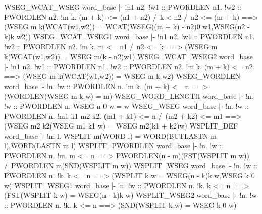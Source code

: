 \ENDTHEOREM
\THEOREM WSEG\_WCAT\_WSEG word\_base
|- !n1 n2.
    !w1 :: PWORDLEN n1.
     !w2 :: PWORDLEN n2.
      !m k.
       (m + k) <= (n1 + n2) /\ k < n2 /\ n2 <= (m + k) ==>
       (WSEG m k(WCAT(w1,w2)) =
        WCAT(WSEG((m + k) - n2)0 w1,WSEG(n2 - k)k w2))
\ENDTHEOREM
\THEOREM WSEG\_WCAT\_WSEG1 word\_base
|- !n1 n2.
    !w1 :: PWORDLEN n1.
     !w2 :: PWORDLEN n2.
      !m k.
       m <= n1 /\ n2 <= k ==> (WSEG m k(WCAT(w1,w2)) = WSEG m(k - n2)w1)
\ENDTHEOREM
\THEOREM WSEG\_WCAT\_WSEG2 word\_base
|- !n1 n2.
    !w1 :: PWORDLEN n1.
     !w2 :: PWORDLEN n2.
      !m k. (m + k) <= n2 ==> (WSEG m k(WCAT(w1,w2)) = WSEG m k w2)
\ENDTHEOREM
\THEOREM WSEG\_WORDLEN word\_base
|- !n.
    !w :: PWORDLEN n. !m k. (m + k) <= n ==> (WORDLEN(WSEG m k w) = m)
\ENDTHEOREM
\THEOREM WSEG\_WORD\_LENGTH word\_base
|- !n. !w :: PWORDLEN n. WSEG n 0 w = w
\ENDTHEOREM
\THEOREM WSEG\_WSEG word\_base
|- !n.
    !w :: PWORDLEN n.
     !m1 k1 m2 k2.
      (m1 + k1) <= n /\ (m2 + k2) <= m1 ==>
      (WSEG m2 k2(WSEG m1 k1 w) = WSEG m2(k1 + k2)w)
\ENDTHEOREM
\THEOREM WSPLIT\_DEF word\_base
|- !m l. WSPLIT m(WORD l) = WORD(BUTLASTN m l),WORD(LASTN m l)
\ENDTHEOREM
\THEOREM WSPLIT\_PWORDLEN word\_base
|- !n.
    !w :: PWORDLEN n.
     !m.
      m <= n ==>
      PWORDLEN(n - m)(FST(WSPLIT m w)) /\ PWORDLEN m(SND(WSPLIT m w))
\ENDTHEOREM
\THEOREM WSPLIT\_WSEG word\_base
|- !n.
    !w :: PWORDLEN n.
     !k. k <= n ==> (WSPLIT k w = WSEG(n - k)k w,WSEG k 0 w)
\ENDTHEOREM
\THEOREM WSPLIT\_WSEG1 word\_base
|- !n.
    !w :: PWORDLEN n. !k. k <= n ==> (FST(WSPLIT k w) = WSEG(n - k)k w)
\ENDTHEOREM
\THEOREM WSPLIT\_WSEG2 word\_base
|- !n. !w :: PWORDLEN n. !k. k <= n ==> (SND(WSPLIT k w) = WSEG k 0 w)
\ENDTHEOREM
